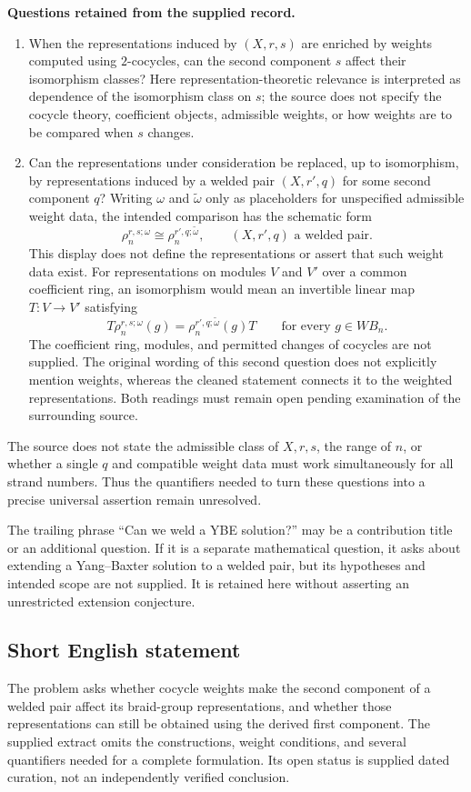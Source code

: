 \documentclass[11pt]{article}
\begin{document}
\textbf{Questions retained from the supplied record.}
\begin{enumerate}
\item When the representations induced by \((X,r,s)\) are enriched by weights computed using \(2\)-cocycles, can the second component \(s\) affect their isomorphism classes? Here representation-theoretic relevance is interpreted as dependence of the isomorphism class on \(s\); the source does not specify the cocycle theory, coefficient objects, admissible weights, or how weights are to be compared when \(s\) changes.
\item Can the representations under consideration be replaced, up to isomorphism, by representations induced by a welded pair \((X,r',q)\) for some second component \(q\)? Writing \(\omega\) and \(\widetilde\omega\) only as placeholders for unspecified admissible weight data, the intended comparison has the schematic form
\[
\rho_n^{r,s;\omega}\cong\rho_n^{r',q;\widetilde\omega},
\qquad (X,r',q)\text{ a welded pair}.
\]
This display does not define the representations or assert that such weight data exist. For representations on modules \(V\) and \(V'\) over a common coefficient ring, an isomorphism would mean an invertible linear map \(T\colon V\to V'\) satisfying
\[
T\rho_n^{r,s;\omega}(g)
=\rho_n^{r',q;\widetilde\omega}(g)T
\qquad\text{for every }g\in WB_n.
\]
The coefficient ring, modules, and permitted changes of cocycles are not supplied. The original wording of this second question does not explicitly mention weights, whereas the cleaned statement connects it to the weighted representations. Both readings must remain open pending examination of the surrounding source.
\end{enumerate}
The source does not state the admissible class of \(X,r,s\), the range of \(n\), or whether a single \(q\) and compatible weight data must work simultaneously for all strand numbers. Thus the quantifiers needed to turn these questions into a precise universal assertion remain unresolved.

The trailing phrase ``Can we weld a YBE solution?'' may be a contribution title or an additional question. If it is a separate mathematical question, it asks about extending a Yang--Baxter solution to a welded pair, but its hypotheses and intended scope are not supplied. It is retained here without asserting an unrestricted extension conjecture.
\subsection{Short English statement}
The problem asks whether cocycle weights make the second component of a welded pair affect its braid-group representations, and whether those representations can still be obtained using the derived first component. The supplied extract omits the constructions, weight conditions, and several quantifiers needed for a complete formulation. Its open status is supplied dated curation, not an independently verified conclusion.
\end{document}
